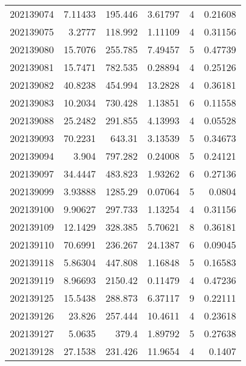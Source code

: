 \begin{tabular}{rrrrrr}
 202139074 &          7.11433 &      195.446  &            3.61797 &           4 & 0.21608 \\
 202139075 &          3.2777  &      118.992  &            1.11109 &           4 & 0.31156 \\
 202139080 &         15.7076  &      255.785  &            7.49457 &           5 & 0.47739 \\
 202139081 &         15.7471  &      782.535  &            0.28894 &           4 & 0.25126 \\
 202139082 &         40.8238  &      454.994  &           13.2828  &           4 & 0.36181 \\
 202139083 &         10.2034  &      730.428  &            1.13851 &           6 & 0.11558 \\
 202139088 &         25.2482  &      291.855  &            4.13993 &           4 & 0.05528 \\
 202139093 &         70.2231  &      643.31   &            3.13539 &           5 & 0.34673 \\
 202139094 &          3.904   &      797.282  &            0.24008 &           5 & 0.24121 \\
 202139097 &         34.4447  &      483.823  &            1.93262 &           6 & 0.27136 \\
 202139099 &          3.93888 &     1285.29   &            0.07064 &           5 & 0.0804  \\
 202139100 &          9.90627 &      297.733  &            1.13254 &           4 & 0.31156 \\
 202139109 &         12.1429  &      328.385  &            5.70621 &           8 & 0.36181 \\
 202139110 &         70.6991  &      236.267  &           24.1387  &           6 & 0.09045 \\
 202139118 &          5.86304 &      447.808  &            1.16848 &           5 & 0.16583 \\
 202139119 &          8.96693 &     2150.42   &            0.11479 &           4 & 0.47236 \\
 202139125 &         15.5438  &      288.873  &            6.37117 &           9 & 0.22111 \\
 202139126 &         23.826   &      257.444  &           10.4611  &           4 & 0.23618 \\
 202139127 &          5.0635  &      379.4    &            1.89792 &           5 & 0.27638 \\
 202139128 &         27.1538  &      231.426  &           11.9654  &           4 & 0.1407  \\

\end{tabular}
